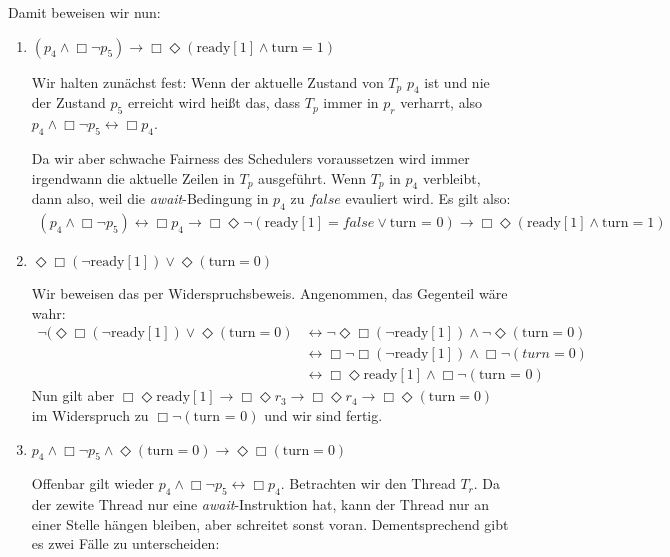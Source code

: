 \documentclass[numbers=noendperiod]{scrartcl}
\begin{document}
Damit beweisen wir nun:
\begin{enumerate}[1.]
	\item $(p_4 \land \Box \lnot p_5) \rightarrow \Box \Diamond (\text{ready}[1] \land \text{turn} = 1)$
	
	Wir halten zunächst fest: Wenn der aktuelle Zustand von $T_p$ $p_4$ ist und nie der Zustand $p_5$ erreicht wird heißt das, dass $T_p$ immer in $p_r$ verharrt, also $p_4 \land \Box \lnot p_5 \leftrightarrow \Box p_4$.
	
	Da wir aber schwache Fairness des Schedulers voraussetzen wird immer irgendwann die aktuelle Zeilen in $T_p$ ausgeführt. Wenn $T_p$ in $p_4$ verbleibt, dann also, weil die \textit{await}-Bedingung in $p_4$ zu $false$ evauliert wird. Es gilt also:
	\begin{align}
		(p_4 \land \Box \lnot p_5) \leftrightarrow \Box p_4 \rightarrow \Box \Diamond \lnot (\text{ready} [1] = false \lor \text{turn = 0}) \rightarrow \Box \Diamond (\text{ready}[1] \land \text{turn} = 1)
	\end{align}

	\item $\Diamond \Box (\lnot \text{ready}[1]) \lor \Diamond (\text{turn} = 0)$
	
	Wir beweisen das per Widerspruchsbeweis. Angenommen, das Gegenteil wäre wahr:
	\begin{align}
		\lnot (\Diamond \Box (\lnot \text{ready}[1]) \lor \Diamond (\text{turn} = 0) &\leftrightarrow \lnot \Diamond \Box (\lnot \text{ready}[1]) \land \lnot \Diamond (\text{turn} = 0)\\
		& \leftrightarrow \Box \lnot \Box  (\lnot \text{ready}[1]) \land \Box \lnot (turn = 0)\\
		& \leftrightarrow \Box \Diamond \text{ready}[1] \land \Box \lnot (\text{turn = 0})
	\end{align}
	Nun gilt aber $\Box \Diamond \text{ready}[1] \rightarrow \Box \Diamond r_3 \rightarrow \Box \Diamond r_4 \rightarrow \Box \Diamond (\text{turn} = 0)$ im Widerspruch zu $\Box \lnot (\text{turn = 0})$ und wir sind fertig.
	
	\item $p_4 \land \Box \lnot p_5 \land \Diamond (\text{turn} = 0) \rightarrow \Diamond \Box (\text{turn} = 0)$
	
	Offenbar gilt wieder $p_4 \land \Box \lnot p_5 \leftrightarrow \Box p_4$. Betrachten wir den Thread $T_r$. Da der zewite Thread nur eine \textit{await}-Instruktion hat, kann der Thread nur an einer Stelle hängen bleiben, aber schreitet sonst voran. Dementsprechend gibt es zwei Fälle zu unterscheiden:
	

\end{enumerate}
\end{document}
